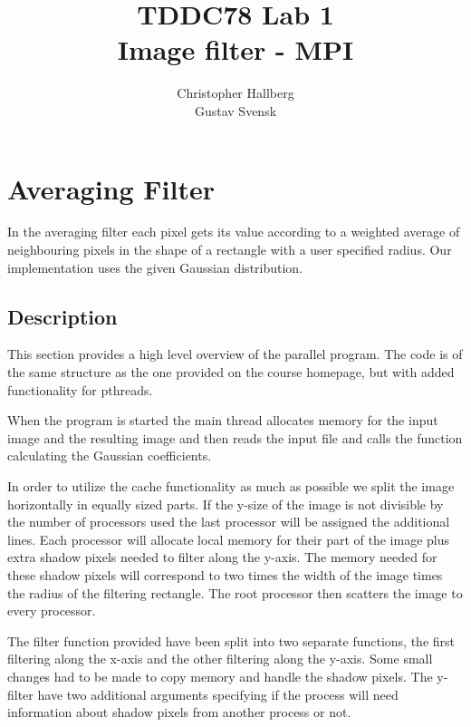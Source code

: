 \documentclass[a4paper, 12pt]{article}
\begin{document}
\title{TDDC78 Lab 1\\
        Image filter - MPI}
\author{Christopher Hallberg \\
        Gustav Svensk}
\maketitle

\thispagestyle{empty}

\newpage
\setcounter{page}{1}
\tableofcontents
\newpage

\section{Averaging Filter}
In the averaging filter each pixel gets its value according to a weighted average
of neighbouring pixels in the shape of a rectangle with a user specified radius. 
Our implementation uses the given Gaussian distribution.

\subsection{Description}
\label{sec:desc}
This section provides a high level overview of the parallel program. 
The code is of the same structure as the one provided on the course homepage,
but with added functionality for pthreads.

When the program is started the main thread allocates memory for the input image
and the resulting image and then reads the input file and calls the function
calculating the Gaussian coefficients. 

In order to utilize the cache functionality as much as possible we split the image
horizontally in equally sized parts. If the y-size of the image is not divisible
by the number of processors used the last processor will be assigned the
additional lines. Each processor will allocate local memory for their part of the
image plus extra shadow pixels needed to filter along the y-axis. The memory
needed for these shadow pixels will correspond to two times the width of the
image times the radius of the filtering rectangle. The root processor then 
scatters the image to every processor.  

The filter function provided have been split into two separate functions, the
first filtering along the x-axis and the other filtering along the y-axis. Some
small changes had to be made to copy memory and handle the shadow pixels. The
y-filter have two additional arguments specifying if the process will need
information about shadow pixels from another process or not. 
\end{document}
